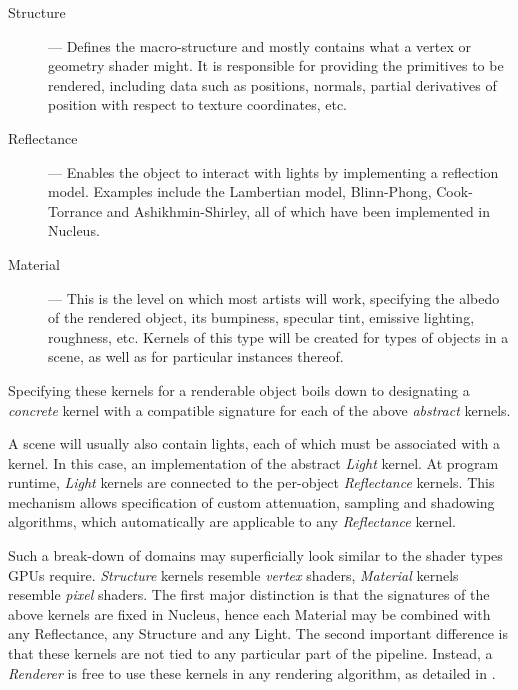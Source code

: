 \begin{description}
\item[Structure] --- Defines the macro-structure and mostly contains what a vertex or geometry shader might. It is responsible for providing the primitives to be rendered, including data such as positions, normals, partial derivatives of position with respect to texture coordinates, etc.

\item[Reflectance] --- Enables the object to interact with lights by implementing a reflection model. Examples include the Lambertian model, Blinn-Phong, Cook-Torrance and Ashikhmin-Shirley, all of which have been implemented in Nucleus.

\item[Material] --- This is the level on which most artists will work, specifying the albedo of the rendered object, its bumpiness, specular tint, emissive lighting, roughness, etc. Kernels of this type will be created for types of objects in a scene, as well as for particular instances thereof.
\end{description}

Specifying these kernels for a renderable object boils down to designating a \emph{concrete} kernel with a compatible signature for each of the above \emph{abstract} kernels.

A scene will usually also contain lights, each of which must be associated with a kernel. In this case, an implementation of the abstract \emph{Light} kernel. At program runtime, \emph{Light} kernels are connected to the per-object \emph{Reflectance} kernels. This mechanism allows specification of custom attenuation, sampling and shadowing algorithms, which automatically are applicable to any \emph{Reflectance} kernel.


Such a break-down of domains may superficially look similar to the shader types GPUs require. \emph{Structure} kernels resemble \emph{vertex} shaders, \emph{Material} kernels resemble \emph{pixel} shaders. The first major distinction is that the signatures of the above kernels are fixed in Nucleus, hence each Material may be combined with any Reflectance, any Structure and any Light. The second important difference is that these kernels are not tied to any particular part of the pipeline. Instead, a \emph{Renderer} is free to use these kernels in any rendering algorithm, as detailed in .

